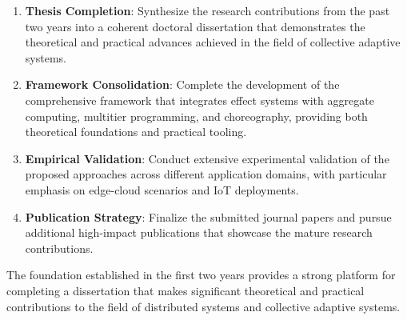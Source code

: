 \documentclass[runningheads]{llncs}
\begin{document}
\begin{enumerate}
\item \textbf{Thesis Completion}: Synthesize the research contributions from the past two years into a coherent doctoral dissertation that demonstrates the theoretical and practical advances achieved in the field of collective adaptive systems.

\item \textbf{Framework Consolidation}: Complete the development of the comprehensive framework that integrates effect systems with aggregate computing, multitier programming, and choreography, providing both theoretical foundations and practical tooling.

\item \textbf{Empirical Validation}: Conduct extensive experimental validation of the proposed approaches across different application domains, with particular emphasis on edge-cloud scenarios and IoT deployments.

\item \textbf{Publication Strategy}: Finalize the submitted journal papers and pursue additional high-impact publications that showcase the mature research contributions.


\end{enumerate}

The foundation established in the first two years provides a strong platform for completing a dissertation that makes significant theoretical and practical contributions to the field of distributed systems and collective adaptive systems.


%
%
%



\nocite{*}
\end{document}
